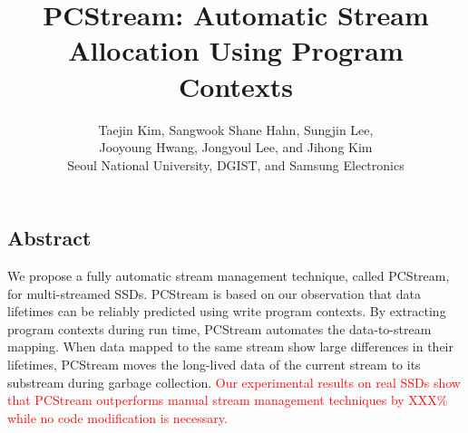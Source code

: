 \documentclass[letterpaper, twocolumn, 10pt]{article}
\begin{document}
\title{
\bf PCStream: Automatic Stream Allocation Using Program Contexts}

\author{
	{\rm Taejin Kim, Sangwook Shane Hahn, Sungjin Lee,} \\ 
	{\rm Jooyoung Hwang, Jongyoul Lee, and Jihong Kim} \\
	Seoul National University, DGIST, and Samsung Electronics
	}

\begin{comment}
\author{
{\rm Taejin Kim}\\
Seoul National University
\and 
{\rm Sangwook Shane Hahn}\\
Seoul National University
\and 
{\rm Sungjin Lee}\\
DGIST
\and 
{\rm Jooyoung Hwang} \\
Samsung Electronics
\and 
{\rm Jongyoul Lee} \\
Samsung Electronics
\and 
{\rm Jihong Kim} \\
Seoul National University
}
\end{comment}

\maketitle
\thispagestyle{empty}

\subsection*{Abstract}
We propose a fully automatic stream management technique, called {\sf PCStream}, 
for multi-streamed SSDs.
{\sf PCStream} is based on our observation that data lifetimes can be reliably predicted using
write program contexts.  
By extracting program contexts during run time,  
{\sf PCStream}  automates the data-to-stream mapping.  
When data mapped to the same
stream show large differences in their lifetimes, {\sf PCStream}
moves the long-lived data of the current stream to 
its substream during garbage collection.
\textcolor{red}{
Our experimental results 
on real SSDs
show that {\sf PCStream} 
outperforms manual stream management techniques by XXX\% 
while no code modification is necessary.}







\end{document}
